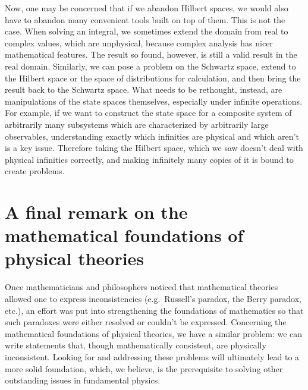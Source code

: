 \documentclass[10pt,twocolumn, nofootinbib]{revtex4-2}
\begin{document}
Now, one may be concerned that if we abandon Hilbert spaces, we would also have to abandon many convenient tools built on top of them. This is not the case. When solving an integral, we sometimes extend the domain from real to complex values, which are unphysical, because complex analysis has nicer mathematical features. The result so found, however, is still a valid result in the real domain. Similarly, we can pose a problem on the Schwartz space, extend to the Hilbert space or the space of distributions for calculation, and then bring the result back to the Schwartz space. What needs to be rethought, instead, are manipulations of the state spaces themselves, especially under infinite operations. For example, if we want to construct the state space for a composite system of arbitrarily many subsystems which are characterized by arbitrarily large observables, understanding exactly which infinities are physical and which aren't is a key issue. Therefore taking the Hilbert space, which we saw doesn't deal with physical infinities correctly, and making infinitely many copies of it is bound to create problems.


\section{A final remark on the mathematical foundations of physical theories}

Once mathematicians and philosophers noticed that mathematical theories allowed one to express inconsistencies (e.g.~Russell's paradox, the Berry paradox, etc.), an effort was put into strengthening the foundations of mathematics so that such paradoxes were either resolved or couldn't be expressed. Concerning the mathematical foundations of physical theories, we have a similar problem: we can write statements that, though mathematically consistent, are physically inconsistent. Looking for and addressing these problems will ultimately lead to a more solid foundation, which, we believe, is the prerequisite to solving other outstanding issues in fundamental physics.
\end{document}
